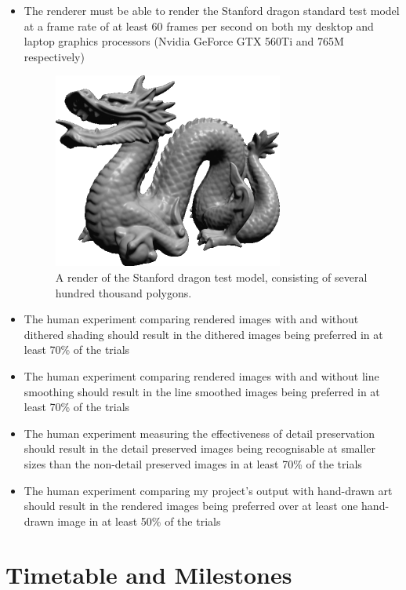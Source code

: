 \documentclass[12pt]{article}
\begin{document}
\begin{itemize}

\item The renderer must be able to render the Stanford dragon standard test model at a frame rate of at least 60 frames per second on both my desktop and laptop graphics processors (Nvidia GeForce GTX 560Ti and 765M respectively)

\begin{figure}[h!]
\centering
\includegraphics{stanforddragon}
\caption{A render of the Stanford dragon test model, consisting of several hundred thousand polygons.}
\end{figure}

\item The human experiment comparing rendered images with and without dithered shading should result in the dithered images being preferred in at least 70\% of the trials

\item The human experiment comparing rendered images with and without line smoothing should result in the line smoothed images being preferred in at least 70\% of the trials

\item The human experiment measuring the effectiveness of detail preservation should result in the detail preserved images being recognisable at smaller sizes than the non-detail preserved images in at least 70\% of the trials

\item The human experiment comparing my project's output with hand-drawn art should result in the rendered images being preferred over at least one hand-drawn image in at least 50\% of the trials

\end{itemize}

\section*{Timetable and Milestones}
\end{document}
